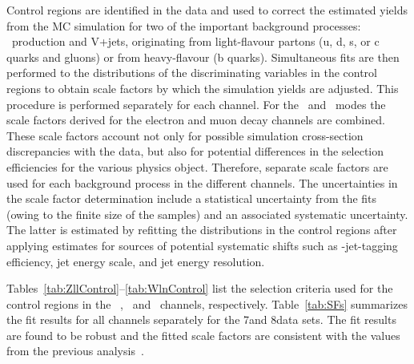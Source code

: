 \documentclass[11pt,twoside,a4paper,cmspaper,final,collab]{cms-tdr}
\begin{document}
Control regions are identified in the data and used to correct
the estimated yields from the MC simulation
for two of the important background processes:  \ttbar\ production and
V+jets, originating from light-flavour partons (u, d, s, or c
quarks and gluons) or from heavy-flavour (b quarks).
Simultaneous fits are then performed to the distributions of the discriminating
variables in the control regions to obtain scale factors by which the simulation
yields are adjusted. This procedure is performed separately for
each channel. For the \ZllH\ and \WH\ modes the scale factors
derived for the electron and muon decay channels are combined.
These scale factors  account not only for possible simulation cross-section discrepancies
with the data, but also for potential
differences in the selection efficiencies for the various physics object.
Therefore, separate scale factors are used for each background
process in the different channels. The uncertainties in the scale factor determination include
a statistical uncertainty from the fits (owing to the finite size of the samples)
 and an associated systematic uncertainty. The latter is estimated by refitting the
 distributions in the control regions after applying estimates
for sources of potential systematic shifts
such as \cPqb-jet-tagging efficiency, jet energy scale, and jet energy resolution.

Tables~\ref{tab:ZllControl}--\ref{tab:WlnControl} list the selection criteria
used for the control regions in the \ZllH\ , \ZnnH\, and \WH\ channels,
respectively. Table~\ref{tab:SFs} summarizes the fit results
for all channels separately for the 7\TeV and 8\TeV data sets.  The fit results are
found to be robust and the fitted scale factors are consistent with the values
from the previous analysis~\cite{VHbb_PLB}.
\end{document}
